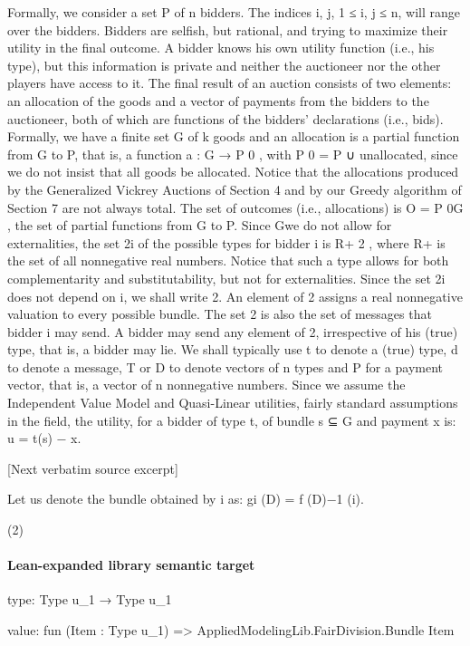 \documentclass[10pt]{article}
\begin{document}
\begin{ReviewVerbatim}
Formally, we consider a set P of n bidders. The indices i, j, 1 ≤ i, j ≤ n, will
range over the bidders. Bidders are selfish, but rational, and trying to maximize their
utility in the final outcome. A bidder knows his own utility function (i.e., his type),
but this information is private and neither the auctioneer nor the other players have
access to it. The final result of an auction consists of two elements: an allocation
of the goods and a vector of payments from the bidders to the auctioneer, both of
which are functions of the bidders’ declarations (i.e., bids). Formally, we have a
finite set G of k goods and an allocation is a partial function from G to P, that is, a
function a : G → P 0 , with P 0 = P ∪ {unallocated}, since we do not insist that all
goods be allocated. Notice that the allocations produced by the Generalized Vickrey
Auctions of Section 4 and by our Greedy algorithm of Section 7 are not always
total. The set of outcomes (i.e., allocations) is O = P 0G , the set of partial functions
from G to P. Since Gwe do not allow for externalities, the set 2i of the possible types
for bidder i is R+ 2 , where R+ is the set of all nonnegative real numbers. Notice
that such a type allows for both complementarity and substitutability, but not for
externalities. Since the set 2i does not depend on i, we shall write 2. An element
of 2 assigns a real nonnegative valuation to every possible bundle. The set 2 is
also the set of messages that bidder i may send. A bidder may send any element of
2, irrespective of his (true) type, that is, a bidder may lie. We shall typically use t
to denote a (true) type, d to denote a message, T or D to denote vectors of n types
and P for a payment vector, that is, a vector of n nonnegative numbers.
Since we assume the Independent Value Model and Quasi-Linear utilities, fairly
standard assumptions in the field, the utility, for a bidder of type t, of bundle s ⊆ G
and payment x is:
u = t(s) − x.

[Next verbatim source excerpt]

Let us denote the bundle obtained by i as:
gi (D) = f (D)−1 (i).

(2)
\end{ReviewVerbatim}



\paragraph{Lean-expanded library semantic target}
\begin{ReviewVerbatim}
type:
Type u_1 → Type u_1

value:
fun (Item : Type u_1) => AppliedModelingLib.FairDivision.Bundle Item
\end{ReviewVerbatim}
\end{document}
